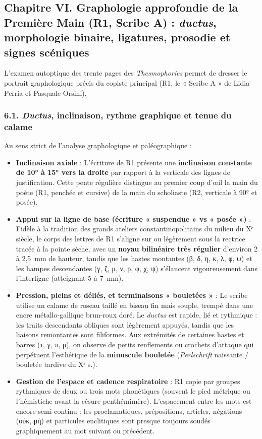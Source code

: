 \documentclass[11pt, a4paper, twoside]{article}
\renewcommand{\_}{\origunderscore\penalty0\relax}
\renewcommand{\texttt}[1]{#1}
\newcommand{\Run}{\textbf{R}\textsuperscript{1}}
\newcommand{\Rdeux}{\textbf{R}\textsuperscript{2}}
\def\Run{R1}%
\def\Rdeux{R2}%
\begin{document}
\subsection{Chapitre VI. Graphologie approfondie de la Première Main (\texorpdfstring{\Run{}}{R1}, Scribe A) : \textit{ductus}, morphologie binaire, ligatures, prosodie et signes scéniques}

L'examen autoptique des trente pages des \textit{Thesmophories} permet de dresser le portrait graphologique précis du copiste principal (\Run{}, le « Scribe A » de Lidia Perria et Pasquale Orsini).


\subsubsection{6.1. \textit{Ductus}, inclinaison, rythme graphique et tenue du calame}

Au sens strict de l'analyse graphologique et paléographique :
\begin{itemize}[leftmargin=1.5em, itemsep=2pt]
  \item \textbf{Inclinaison axiale} : L'écriture de \Run{} présente une \textbf{inclinaison constante de 10° à 15° vers la droite} par rapport à la verticale des lignes de justification. Cette pente régulière distingue au premier coup d'œil la main du poète (\Run{}, penchée et cursive) de la main du scholiaste (\Rdeux{}, verticale à 90° et posée).
  \item \textbf{Appui sur la ligne de base (écriture « suspendue » vs « posée »)} : Fidèle à la tradition des grands ateliers constantinopolitains du milieu du Xᵉ siècle, le corps des lettres de \Run{} s'aligne sur ou légèrement sous la rectrice tracée à la pointe sèche, avec un \textbf{noyau bilinéaire très régulier} d'environ 2 à 2,5~mm de hauteur, tandis que les hastes montantes (β, δ, η, κ, λ, φ, ψ) et les hampes descendantes (γ, ζ, μ, ν, ρ, φ, χ, ψ) s'élancent vigoureusement dans l'interligne (atteignant 5 à 7~mm).
  \item \textbf{Pression, pleins et déliés, et terminaisons « bouletées »} : Le scribe utilise un calame de roseau taillé en biseau fin mais souple, trempé dans une encre métallo-gallique brun-roux doré. Le \textit{ductus} est rapide, lié et rythmique : les traits descendants obliques sont légèrement appuyés, tandis que les liaisons remontantes sont filiformes. Aux extrémités de certaines hastes et barres (τ, γ, π, ρ), on observe de petits renflements ou crochets d'attaque qui perpétuent l'esthétique de la \textbf{minuscule bouletée} (\textit{Perlschrift} naissante / bouletée tardive du Xᵉ s.).
  \item \textbf{Gestion de l'espace et cadence respiratoire} : \Run{} copie par groupes rythmiques de deux ou trois mots phonétiques (souvent le pied métrique ou l'hémistiche avant la césure penthémimère). L'espacement entre les mots est encore semi-continu : les proclamatiques, prépositions, articles, négations (\texttt{οὐκ}, \texttt{μὴ}) et particules enclitiques sont presque toujours soudés graphiquement au mot suivant ou précédent.
\end{itemize}
\end{document}
